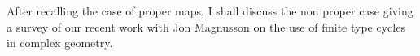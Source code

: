 {%
    After recalling the case of proper maps, I shall discuss the non
    proper case giving a survey of our recent work with Jon Magnusson
    on the use of finite type cycles in complex geometry.
}

